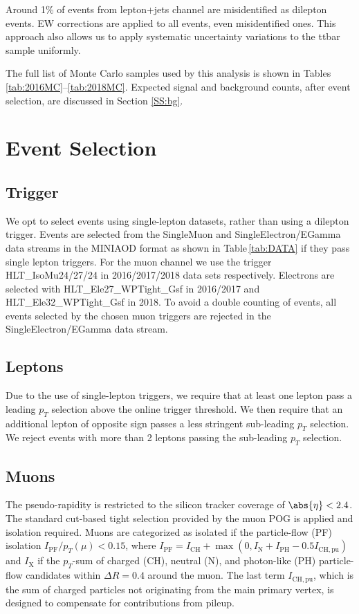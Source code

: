 Around 1\% of \ttbar events from lepton+jets  channel are misidentified as dilepton events.  EW corrections are applied to all \ttbar events,  even  misidentified ones. This approach also allows us to apply systematic uncertainty variations to the ttbar sample uniformly.

The full list of Monte Carlo samples used by this analysis is shown in Tables \ref{tab:2016MC}--\ref{tab:2018MC}.  Expected signal and background counts, after event selection, are discussed in Section \ref{SS:bg}.

\label{S:data}

\clearpage
\section{Event Selection}
\label{S:selection}

\subsection{Trigger}
\label{SS:trigger}

We opt to select events using single-lepton datasets, rather than using a dilepton trigger. Events are selected from the SingleMuon and SingleElectron/EGamma data streams in the MINIAOD format as shown in Table\,\ref{tab:DATA} if they pass single lepton triggers. For the muon channel we use the trigger HLT\_IsoMu24/27/24  in 2016/2017/2018 data sets respectively. Electrons are selected with HLT\_Ele27\_WPTight\_Gsf in 2016/2017 and HLT\_Ele32\_WPTight\_Gsf in 2018. To avoid a double counting of events, all events selected by the chosen muon triggers are rejected in the SingleElectron/EGamma data stream. 


\subsection{Leptons}
Due to the use of single-lepton triggers, we require that at least one lepton pass a leading $p_T$ selection above the online trigger threshold. We then require that an additional lepton of opposite sign passes a less stringent sub-leading $p_T$ selection. We reject events with more than 2 leptons passing the sub-leading $p_T$ selection.

\subsection*{Muons}
The pseudo-rapidity is restricted to the silicon tracker coverage of $\abs{\eta} < 2.4$. The standard cut-based tight selection provided by the muon POG is applied and isolation required. Muons are categorized as isolated if the particle-flow (PF) isolation $I_\mathrm{PF}/p_T(\mu) < 0.15$, where $I_\mathrm{PF} = I_\mathrm{CH} + \max(0, I_\mathrm{N} + I_\mathrm{PH} - 0.5 I_\mathrm{CH,pu})$ and $I_\mathrm{X}$ if the $p_T$-sum of charged (CH), neutral (N), and photon-like (PH) particle-flow candidates within $\Delta R = 0.4$ around the muon. The last term $I_\mathrm{CH,pu}$, which is the sum of charged particles not originating from the main primary vertex, is designed to compensate for contributions from pileup. 

